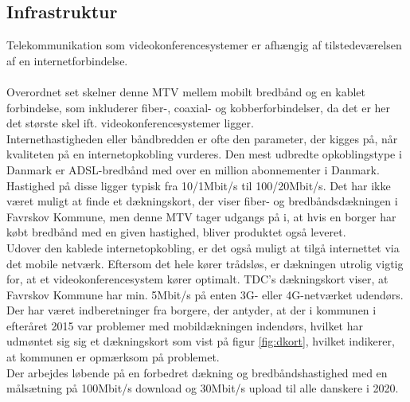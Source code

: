 \subsection{Infrastruktur}
Telekommunikation som videokonferencesystemer er afhængig af tilstedeværelsen af en  internetforbindelse.\\
\\Overordnet set skelner denne MTV mellem mobilt bredbånd og en kablet forbindelse, som inkluderer fiber-, coaxial- og kobberforbindelser, da det er her det største skel ift. videokonferencesystemer ligger.\\
Internethastigheden eller båndbredden er ofte den parameter, der kigges på, når kvaliteten på en internetopkobling vurderes. Den mest udbredte opkoblingstype i Danmark er ADSL-bredbånd med over en million abonnementer i Danmark\cite{statadsl}. Hastighed på disse ligger typisk fra 10/1Mbit/s til 100/20Mbit/s\cite{tdchastigheder}\cite{telenorhastigheder}. Det har ikke været muligt at finde et dækningskort, der viser fiber- og bredbåndsdækningen i Favrskov Kommune, men denne MTV tager udgangs på i, at hvis en borger har købt bredbånd med en given hastighed, bliver produktet også leveret.\\
Udover den kablede internetopkobling, er det også muligt at tilgå internettet via det mobile netværk. Eftersom det hele kører trådsløs, er dækningen utrolig vigtig for, at et videokonferencesystem kører optimalt. TDC's dækningskort viser, at Favrskov Kommune har min. 5Mbit/s på enten 3G- eller 4G-netværket udendørs\cite{tdcdaekning}.
Der har været indberetninger fra borgere, der antyder, at der i kommunen i efteråret 2015 var problemer med mobildækningen indendørs\cite{tv2oj_daekning}, hvilket har udmøntet sig sig et dækningskort som vist på figur \ref{fig:dkort}, hvilket indikerer, at kommunen er opmærksom på problemet.\\
Der arbejdes løbende på en forbedret dækning og bredbåndshastighed med en målsætning på 100Mbit/s download og 30Mbit/s upload til alle danskere i 2020\cite{digitalvel}.
